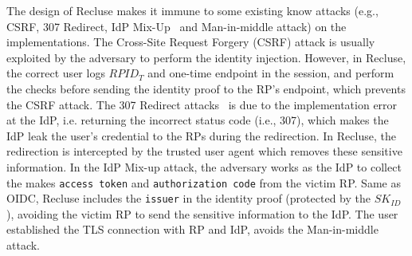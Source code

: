 The design of Recluse makes it immune to some existing know attacks (e.g., CSRF, 307 Redirect, IdP Mix-Up~\cite{FettKS16} and Man-in-middle attack) on the implementations. The Cross-Site Request Forgery (CSRF) attack is  usually exploited by the adversary to perform the identity injection. However, in Recluse, the correct user logs  $RPID_T$ and one-time endpoint in the session,  and perform the checks before sending the identity proof to the RP's endpoint, which prevents the CSRF attack.  The 307 Redirect attacks~\cite{FettKS16} is due to the implementation error at the IdP, i.e. returning the incorrect status code (i.e., 307), which makes the IdP leak the user's credential to the RPs during the redirection. In Recluse, the redirection is intercepted by the trusted user agent which removes these sensitive information. In the IdP Mix-up attack, the adversary works as the IdP to collect the  makes \verb+access token+ and \verb+authorization code+  from the victim RP. Same as OIDC, Recluse includes the \verb+issuer+ in the identity proof (protected by the $SK_{ID}$), avoiding the victim RP to send the sensitive information to the IdP. The user established the TLS connection with RP and IdP, avoids the Man-in-middle attack.

